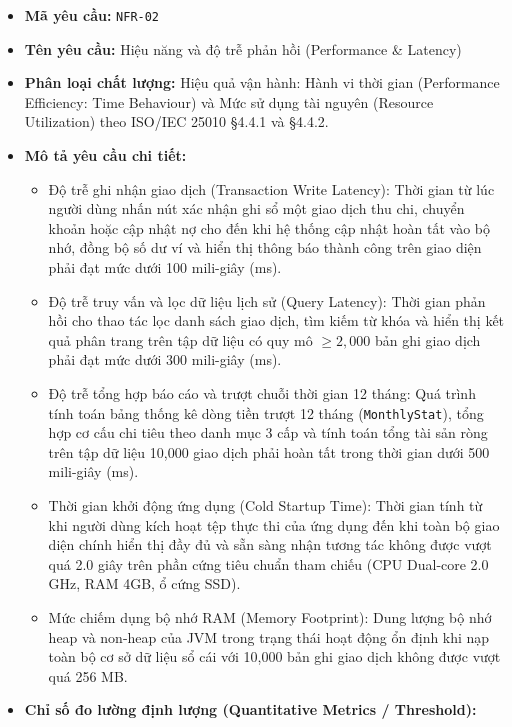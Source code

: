 \documentclass[11pt,a4paper]{article}
\providecommand{\tightlist}{
  \setlength{\itemsep}{0pt}\setlength{\parskip}{0pt}}
\begin{document}
\begin{itemize}
\tightlist
\item
  \textbf{Mã yêu cầu:} \texttt{NFR-02}
\item
  \textbf{Tên yêu cầu:} Hiệu năng và độ trễ phản hồi (Performance \&
  Latency)
\item
  \textbf{Phân loại chất lượng:} Hiệu quả vận hành: Hành vi thời gian
  (Performance Efficiency: Time Behaviour) và Mức sử dụng tài nguyên
  (Resource Utilization) theo ISO/IEC 25010 §4.4.1 và §4.4.2.
\item
  \textbf{Mô tả yêu cầu chi tiết:}

  \begin{itemize}
  \tightlist
  \item
    Độ trễ ghi nhận giao dịch (Transaction Write Latency): Thời gian từ
    lúc người dùng nhấn nút xác nhận ghi sổ một giao dịch thu chi,
    chuyển khoản hoặc cập nhật nợ cho đến khi hệ thống cập nhật hoàn tất
    vào bộ nhớ, đồng bộ số dư ví và hiển thị thông báo thành công trên
    giao diện phải đạt mức dưới 100 mili-giây (ms).
  \item
    Độ trễ truy vấn và lọc dữ liệu lịch sử (Query Latency): Thời gian
    phản hồi cho thao tác lọc danh sách giao dịch, tìm kiếm từ khóa và
    hiển thị kết quả phân trang trên tập dữ liệu có quy mô \(\ge 2,000\)
    bản ghi giao dịch phải đạt mức dưới 300 mili-giây (ms).
  \item
    Độ trễ tổng hợp báo cáo và trượt chuỗi thời gian 12 tháng: Quá trình
    tính toán bảng thống kê dòng tiền trượt 12 tháng
    (\texttt{MonthlyStat}), tổng hợp cơ cấu chi tiêu theo danh mục 3 cấp
    và tính toán tổng tài sản ròng trên tập dữ liệu 10,000 giao dịch
    phải hoàn tất trong thời gian dưới 500 mili-giây (ms).
  \item
    Thời gian khởi động ứng dụng (Cold Startup Time): Thời gian tính từ
    khi người dùng kích hoạt tệp thực thi của ứng dụng đến khi toàn bộ
    giao diện chính hiển thị đầy đủ và sẵn sàng nhận tương tác không
    được vượt quá 2.0 giây trên phần cứng tiêu chuẩn tham chiếu (CPU
    Dual-core 2.0 GHz, RAM 4GB, ổ cứng SSD).
  \item
    Mức chiếm dụng bộ nhớ RAM (Memory Footprint): Dung lượng bộ nhớ heap
    và non-heap của JVM trong trạng thái hoạt động ổn định khi nạp toàn
    bộ cơ sở dữ liệu sổ cái với 10,000 bản ghi giao dịch không được vượt
    quá 256 MB.
  \end{itemize}
\item
  \textbf{Chỉ số đo lường định lượng (Quantitative Metrics /
  Threshold):}


\end{itemize}
\end{document}
